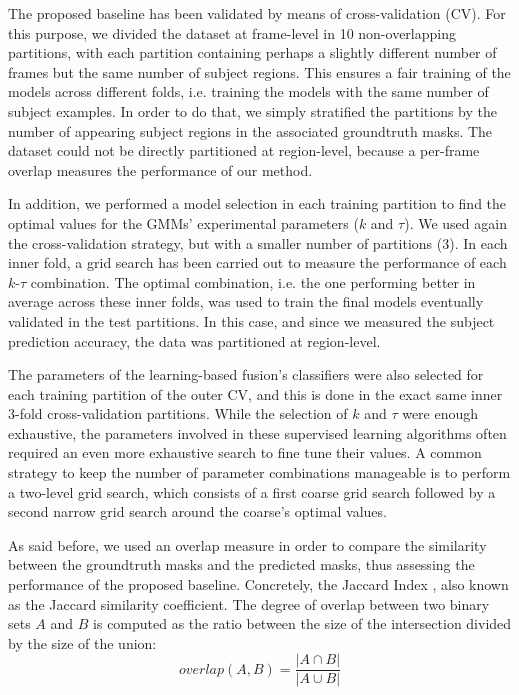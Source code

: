 \documentclass[10pt,twocolumn,letterpaper]{article}
\begin{document}
The proposed baseline has been validated by means of cross-validation (CV). For this purpose, we divided the dataset at frame-level in 10 non-overlapping partitions, with each partition containing perhaps a slightly different number of frames but the same number of subject regions. This ensures a fair training of the models across different folds, i.e. training the models with the same number of subject examples. In order to do that, we simply stratified the partitions by the number of appearing subject regions in the associated groundtruth masks. The dataset could not be directly partitioned at region-level, because a per-frame overlap measures the performance of our method.

In addition, we performed a model selection in each training partition to find the optimal values for the GMMs' experimental parameters ($k$ and $\tau$). We used again the cross-validation strategy, but with a smaller number of partitions (3). In each inner fold, a grid search has been carried out to measure the performance of each $k$-$\tau$ combination. The optimal combination, i.e. the one performing better in average across these inner folds, was used to train the final models eventually validated in the test partitions. In this case, and since we measured the subject prediction accuracy, the data was partitioned at region-level.

The parameters of the learning-based fusion's classifiers were also selected for each training partition of the outer CV, and this is done in the exact same inner 3-fold cross-validation partitions. While the selection of $k$ and $\tau$ were  enough exhaustive, the parameters involved in these supervised learning algorithms often required an even more exhaustive search to fine tune their values. A common strategy to keep the number of parameter combinations manageable is to perform a two-level grid search, which consists of a first coarse grid search followed by a second narrow grid search around the coarse's optimal values.


As said before, we used an overlap measure in order to compare the similarity between the groundtruth masks and the predicted masks, thus assessing the performance of the proposed baseline. Concretely, the Jaccard Index \cite{tan2002selecting}, also known as the Jaccard similarity coefficient. The degree of overlap between two binary sets $A$ and $B$ is computed as the ratio between the size of the intersection divided by the size of the union:
\begin{equation} \label{eq:jaccard}
overlap(A, B) = \frac{|A \cap B|}{|A \cup B|}
\end{equation}
\end{document}
